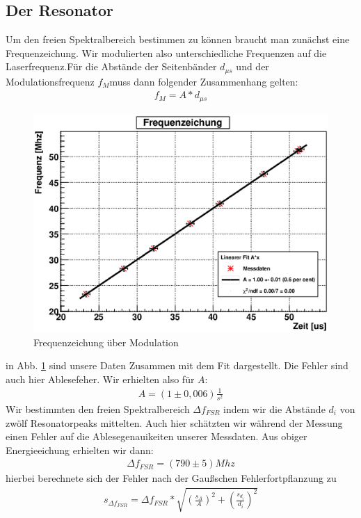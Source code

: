 \documentclass[12pt]{article}
\begin{document}
\subsection{Der Resonator}
Um den freien Spektralbereich bestimmen zu können braucht man zunächst eine Frequenzeichung. Wir modulierten also unterschiedliche Frequenzen auf die Laserfrequenz.Für die Abstände der Seitenbänder $d_{\mu s}$ und der Modulationsfrequenz $f_M$muss dann folgender Zusammenhang gelten:
\begin{align*}
 f_M = A * d_{\mu s}
\end{align*} 
\begin{figure}[H]
 \includegraphics[width=0.9\linewidth]{pictures/eichung.eps}
 \caption{Frequenzeichung über Modulation}
 \label{eichung}
\end{figure}
in Abb. \ref{eichung} sind unsere Daten Zusammen mit dem Fit dargestellt. Die Fehler sind auch hier Ablesefeher. Wir erhielten also für $A$:
\begin{align*}
 A = (1 \pm 0,006) \frac{1}{s^2}
\end{align*} 
Wir bestimmten den freien Spektralbereich $\Delta f_{FSR}$ indem wir die Abstände $d_i$ von zwölf Resonatorpeaks mittelten. Auch hier schätzten wir während der Messung einen Fehler auf die Ablesegenauikeiten unserer Messdaten. Aus obiger Energieeichung erhielten wir dann:
\begin{align*}
 \Delta f_{FSR} = (790\pm5) Mhz
\end{align*}
hierbei berechnete sich der Fehler nach der Gaußschen Fehlerfortpflanzung zu
\begin{align*}
 s_{\Delta f_{FSR}} = \Delta f_{FSR} * \sqrt{ \left( \frac{s_A}{A} \right)^2 + \left( \frac{s_{d_i}}{d_i} \right)^2}
\end{align*}
\end{document}
